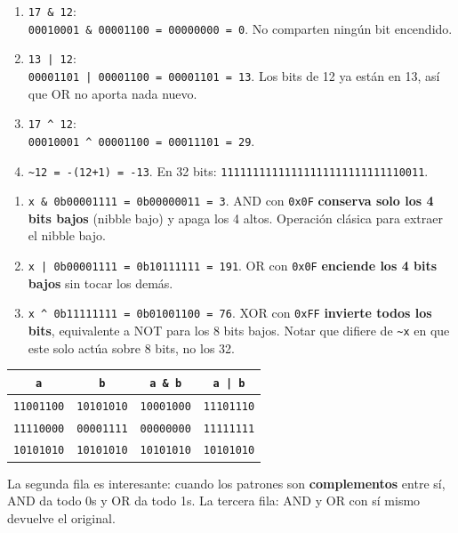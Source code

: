 \documentclass[12pt, oneside]{article}
\begin{document}
\begin{notaprofesor}[Ejercicio 4]
\begin{enumerate}[label=\alph*)]
  \item \texttt{17 \& 12}:\\
        \texttt{00010001 \& 00001100 = 00000000 = 0}.
        No comparten ningún bit encendido.
  \item \texttt{13 | 12}:\\
        \texttt{00001101 | 00001100 = 00001101 = 13}.
        Los bits de 12 ya están en 13, así que OR no aporta nada nuevo.
  \item \texttt{17 \^{} 12}:\\
        \texttt{00010001 \^{} 00001100 = 00011101 = 29}.
  \item \texttt{\textasciitilde 12 = -(12+1) = -13}.
        En 32 bits: \texttt{11111111111111111111111111110011}.
\end{enumerate}
\end{notaprofesor}

\begin{notaprofesor}[Ejercicio 5 — \texttt{x = 0b10110011}]
\begin{enumerate}[label=\alph*)]
  \item \texttt{x \& 0b00001111 = 0b00000011 = 3}.
        AND con \texttt{0x0F} \textbf{conserva solo los 4 bits bajos}
        (nibble bajo) y apaga los 4 altos. Operación clásica para extraer
        el nibble bajo.
  \item \texttt{x | 0b00001111 = 0b10111111 = 191}.
        OR con \texttt{0x0F} \textbf{enciende los 4 bits bajos} sin tocar
        los demás.
  \item \texttt{x \^{} 0b11111111 = 0b01001100 = 76}.
        XOR con \texttt{0xFF} \textbf{invierte todos los bits}, equivalente
        a NOT para los 8 bits bajos. Notar que difiere de \texttt{\textasciitilde x}
        en que este solo actúa sobre 8 bits, no los 32.
\end{enumerate}
\end{notaprofesor}

\begin{notaprofesor}
\begin{center}
\begin{tabular}{cccc}
  \toprule
  \texttt{a} & \texttt{b} & \texttt{a \& b} & \texttt{a | b} \\
  \midrule
  \texttt{11001100} & \texttt{10101010} & \texttt{10001000} & \texttt{11101110} \\
  \texttt{11110000} & \texttt{00001111} & \texttt{00000000} & \texttt{11111111} \\
  \texttt{10101010} & \texttt{10101010} & \texttt{10101010} & \texttt{10101010} \\
  \bottomrule
\end{tabular}
\end{center}
La segunda fila es interesante: cuando los patrones son \textbf{complementos}
entre sí, AND da todo 0s y OR da todo 1s.
La tercera fila: AND y OR con sí mismo devuelve el original.
\end{notaprofesor}
\end{document}
